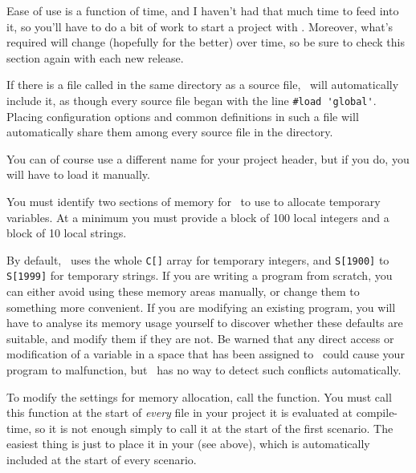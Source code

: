     

Ease of use is a function of time, and I haven't had that much time to feed into 
it, so you'll have to do a bit of work to start a project with \package. 
Moreover, what's required will change (hopefully for the better) over time, so 
be sure to check this section again with each new release.


  If there is a file called  in the same directory as a source
  file, \compiler\ will automatically include it, as though every source file
  began with the line \lstinline|#load 'global'|.  Placing configuration
  options and common definitions in such a file will automatically share them
  among every source file in the directory.
  
  You can of course use a different name for your project header, but if you do,
  you will have to load it manually.

\label{sec:allocation}

  You must identify two sections of memory for \compiler\ to use to allocate 
  temporary variables.  At a minimum you must provide a block of 100 local 
  integers and a block of 10 local strings.
  
  By default, \compiler\ uses the whole \lstinline|C[]| array for temporary 
  integers, and \lstinline|S[1900]| to \lstinline|S[1999]| for temporary 
  strings.  If you are writing a program from scratch, you can either avoid 
  using these memory areas manually, or change them to something more 
  convenient.  If you are modifying an existing program, you will have to 
  analyse its memory usage yourself to discover whether these defaults are 
  suitable, and modify them if they are not.  Be warned that any direct access 
  or modification of a variable in a space that has been assigned to \compiler\ 
  could cause your program to malfunction, but \compiler\ has no way to detect 
  such conflicts automatically.
  
  To modify the settings for memory allocation, call the 
   function.  You must call this function at the start 
  of \emph{every} file in your project\,\textemdash\,it is evaluated at 
  compile-time, so it is not enough simply to call it at the start of the first 
  scenario.  The easiest thing is just to place it in your \file{global.kh} (see 
  above), which is automatically included at the start of every scenario.